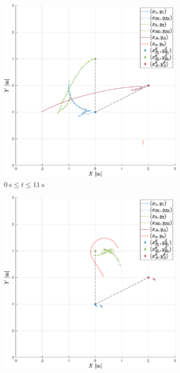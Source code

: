 \documentclass{ifacconf}
\begin{document}
\begin{figure}
    \centering
    \begin{subfigure}[b]{0.32\columnwidth}
        \centering
        \includegraphics[width=\linewidth]{images/experiment/dynamic_obstacles/dynamicObst_exp_far.eps}
         \caption{$\SI{0}{\second} \leq  t \leq \SI{11}{\second}$}
    \end{subfigure}
    \begin{subfigure}[b]{0.32\columnwidth}
        \centering
        \includegraphics[width=\linewidth]{images/experiment/dynamic_obstacles/dynamicObst_exp_closeR2.eps}

\end{subfigure}
\end{figure}
\end{document}
